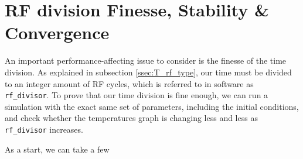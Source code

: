 \section{RF division Finesse, Stability \& Convergence}\label{sec:comp/convergence}

An important performance-affecting issue to consider is the finesse of the time division. As explained in subsection \ref{ssec:T_rf_type}, our time must be divided to an integer amount of RF cycles, which is referred to in software as \texttt{rf\_divisor}. To prove that our time division is fine enough, we can run a simulation with the exact same set of parameters, including the initial conditions, and check whether the temperatures graph is changing less and less as \texttt{rf\_divisor} increases.

As a start, we can take a few

